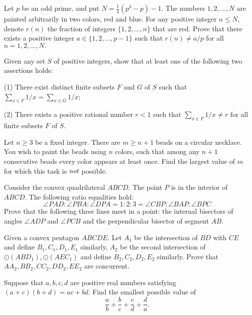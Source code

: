 \documentclass[11pt]{scrartcl}
\begin{document}
\begin{problem}[47893544380608]
	Let $p$ be an odd prime, and put $N=\frac{1}{4} (p^3 -p) -1.$ The numbers $1,2, \dots, N$ are painted arbitrarily in two colors, red and blue. For any positive integer $n \leqslant N,$ denote $r(n)$ the fraction of integers $\{ 1,2, \dots, n \}$ that are red.
Prove that there exists a positive integer $a \in \{ 1,2, \dots, p-1\}$ such that $r(n) \neq a/p$ for all $n = 1,2, \dots , N.$
\end{problem}
\begin{problem}[120381541018683]
Given any set $S$ of positive integers, show that at least one of the following two assertions holds:

(1) There exist distinct finite subsets $F$ and $G$ of $S$ such that $\sum_{x\in F}1/x=\sum_{x\in G}1/x$;

(2) There exists a positive rational number $r<1$ such that $\sum_{x\in F}1/x\neq r$ for all finite subsets $F$ of $S$.
\end{problem}
\begin{problem}[822921222405372]
Let $n\ge 3$ be a fixed integer. There are $m\ge n+1$ beads on a circular necklace. You wish to paint the beads using $n$ colors, such that among any $n+1$ consecutive beads every color appears at least once. Find the largest value of $m$ for which this task is $\emph{not}$ possible.
\end{problem}
\begin{problem}[915478364939250]
Consider the convex quadrilateral $ABCD$. The point $P$ is in the interior of $ABCD$. The following ratio equalities hold:
\[\angle PAD:\angle PBA:\angle DPA=1:2:3=\angle CBP:\angle BAP:\angle BPC\]Prove that the following three lines meet in a point: the internal bisectors of angles $\angle ADP$ and $\angle PCB$ and the perpendicular bisector of segment $AB$.
\end{problem}
\begin{problem}[651308339506337942]
Given a convex pentagon $ ABCDE. $ Let $ A_1 $ be the intersection of $ BD $ with $ CE $ and define $ B_1, C_1, D_1, E_1 $ similarly, $ A_2 $ be the second intersection of $ \odot (ABD_1),\odot (AEC_1) $ and define $ B_2, C_2, D_2, E_2 $ similarly. Prove that $ AA_2, BB_2, CC_2, DD_2, EE_2 $ are concurrent.
\end{problem}
\begin{problem}[132497611943266]
Suppose that $a,b,c,d$ are positive real numbers satisfying $(a+c)(b+d)=ac+bd$. Find the smallest possible value of
$$\frac{a}{b}+\frac{b}{c}+\frac{c}{d}+\frac{d}{a}.$$
\end{problem}
\end{document}
